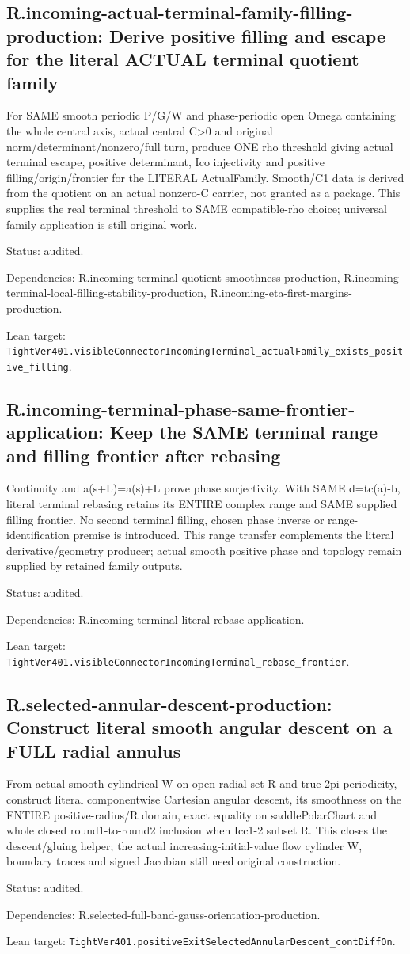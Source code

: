 \documentclass{article}
\begin{document}
\subsection*{R.incoming-actual-terminal-family-filling-production: Derive positive filling and escape for the literal ACTUAL terminal quotient family}
For SAME smooth periodic P/G/W and phase-periodic open Omega containing the whole central axis, actual central C>0 and original norm/determinant/nonzero/full turn, produce ONE rho threshold giving actual terminal escape, positive determinant, Ico injectivity and positive filling/origin/frontier for the LITERAL ActualFamily. Smooth/C1 data is derived from the quotient on an actual nonzero-C carrier, not granted as a package. This supplies the real terminal threshold to SAME compatible-rho choice; universal family application is still original work.
\par Status: audited.
\par Dependencies: R.incoming-terminal-quotient-smoothness-production, R.incoming-terminal-local-filling-stability-production, R.incoming-eta-first-margins-production.
\par Lean target: \texttt{TightVer401.visibleConnectorIncomingTerminal\_actualFamily\_exists\_positive\_filling}.
\subsection*{R.incoming-terminal-phase-same-frontier-application: Keep the SAME terminal range and filling frontier after rebasing}
Continuity and a(s+L)=a(s)+L prove phase surjectivity. With SAME d=tc(a)-b, literal terminal rebasing retains its ENTIRE complex range and SAME supplied filling frontier. No second terminal filling, chosen phase inverse or range-identification premise is introduced. This range transfer complements the literal derivative/geometry producer; actual smooth positive phase and topology remain supplied by retained family outputs.
\par Status: audited.
\par Dependencies: R.incoming-terminal-literal-rebase-application.
\par Lean target: \texttt{TightVer401.visibleConnectorIncomingTerminal\_rebase\_frontier}.
\subsection*{R.selected-annular-descent-production: Construct literal smooth angular descent on a FULL radial annulus}
From actual smooth cylindrical W on open radial set R and true 2pi-periodicity, construct literal componentwise Cartesian angular descent, its smoothness on the ENTIRE positive-radius/R domain, exact equality on saddlePolarChart and whole closed round1-to-round2 inclusion when Icc1-2 subset R. This closes the descent/gluing helper; the actual increasing-initial-value flow cylinder W, boundary traces and signed Jacobian still need original construction.
\par Status: audited.
\par Dependencies: R.selected-full-band-gauss-orientation-production.
\par Lean target: \texttt{TightVer401.positiveExitSelectedAnnularDescent\_contDiffOn}.
\end{document}
